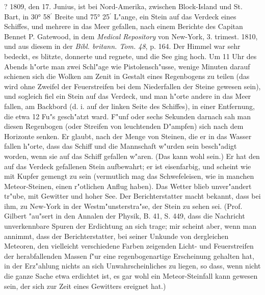 \documentclass[a4paper, 11pt, oneside, polutonikogreek, german]{article}
\begin{document}
? 1809, den 17. Junius, ist bei Nord-Amerika, zwischen Block-Island und St. Bart, in 30° 58$^{\prime}$ Breite und 75° 25$^{\prime}$ L"ange, ein Stein auf das Verdeck eines Schiffes, und mehrere in das Meer gefallen, nach einem Berichte des Capitan Bennet P. Gatewood, in dem \emph{Medical Repository} von New-York, 3. trimest. 1810, und aus diesem in der \emph{Bibl. britann. Tom. 48}, p. 164. Der Himmel war sehr bedeckt, es blitzte, donnerte und regnete, und die See ging hoch. Um 11 Uhr des Abends h"orte man zwei Schl"age wie Pistolensch"usse, wenige Minuten darauf schienen sich die Wolken am Zenit in Gestalt eines Regenbogens zu teilen (das wird ohne Zweifel der Feuerstreifen bei dem Niederfallen der Steine gewesen sein), und sogleich fiel ein Stein auf das Verdeck, und man h"orte andere in das Meer fallen, am Backbord (d. i. auf der linken Seite des Schiffes), in einer Entfernung, die etwa 12 Fu"s gesch"atzt ward. F"unf oder sechs Sekunden darnach sah man diesen Regenbogen (oder Streifen von leuchtenden D"ampfen) sich nach dem Horizonte senken. Er glaubt, nach der Menge von Steinen, die er in das Wasser fallen h"orte, dass das Schiff und die Mannschaft w"urden sein besch"adigt worden, wenn sie auf das Schiff gefallen w"aren. (Das kann wohl sein.) Er hat den auf das Verdeck gefallenen Stein aufbewahrt; er ist eisenfarbig, und scheint wie mit Kupfer gemengt zu sein (vermutlich mag das Schwefeleisen, wie in manchen Meteor-Steinen, einen r"otlichen Anflug haben). Das Wetter blieb unver"andert tr"ube, mit Gewitter und hoher See. Der Berichterstatter macht bekannt, dass bei ihm, zu New-York in der Westm"unsterstra"se, der Stein zu sehen sei. (Prof. Gilbert "au"sert in den Annalen der Physik, B. 41, S. 449, dass die Nachricht unverkennbare Spuren der Erdichtung an sich trage; mir scheint aber, wenn man annimmt, dass der Berichterstatter, bei seiner Unkunde von dergleichen Meteoren, den vielleicht verschiedene Farben zeigenden Licht- und Feuerstreifen der herabfallenden Massen f"ur eine regenbogenartige Erscheinung gehalten hat, in der Erz"ahlung nichts an sich Unwahrscheinliches zu liegen, so dass, wenn nicht die ganze Sache etwa erdichtet ist, es gar wohl ein Meteor-Steinfall kann gewesen sein, der sich zur Zeit eines Gewitters ereignet hat.)
\end{document}
